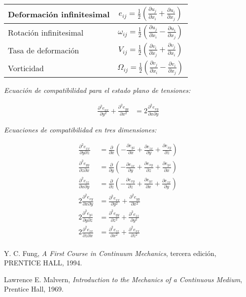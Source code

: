 \documentclass[a4paper,10pt,twoside,final,spanish]{article}
\begin{document}
\begin{center}
\begin{tabular}{l c} \toprule
Deformación infinitesimal & $\displaystyle e_{ij}=\frac{1}{2}\left(\frac{\partial u_{j}}{\partial x_{i}}+\frac{\partial u_{i}}{\partial x_{j}}\right)$ \\ \midrule
Rotación infinitesimal    & $\displaystyle \omega_{ij}=\frac{1}{2}\left(\frac{\partial u_{j}}{\partial x_{i}}-\frac{\partial u_{i}}{\partial x_{j}}\right)$ \\ \midrule
Tasa de deformación       & $\displaystyle V_{ij}=\frac{1}{2}\left(\frac{\partial v_{i}}{\partial x_{j}}+\frac{\partial v_{j}}{\partial x_{i}}\right)$ \\ \midrule
Vorticidad                & $\displaystyle \Omega_{ij}=\frac{1}{2}\left(\frac{\partial v_{j}}{\partial x_{i}}- \frac{\partial v_{i}}{\partial x_{j}}\right)$\\ \bottomrule
\end{tabular}
\end{center}

\vspace{1em}

\textit{Ecuación de compatibilidad para el estado plano de tensiones:}

\begin{align*}
\frac{\partial^{2}e_{xx}}{\partial y^{2}}+\frac{\partial^{2}e_{yy}}{\partial x^{2}}
&= 2\frac{\partial^{2}e_{xy}}{\partial x \partial y}
\end{align*}

\vspace{1em}

\textit{Ecuaciones de compatibilidad en tres dimensiones:}

\begin{align*}
\frac{\partial^{2}e_{xx}}{\partial y \partial z}
&= \frac{\partial}{\partial x}\left(
-\frac{\partial e_{yz}}{\partial x}
+\frac{\partial e_{zx}}{\partial y}
+\frac{\partial e_{xy}}{\partial z}\right) \\
\frac{\partial^{2}e_{yy}}{\partial z \partial x}
&= \frac{\partial}{\partial y}\left(
-\frac{\partial e_{zx}}{\partial y}
+\frac{\partial e_{xy}}{\partial z}
+\frac{\partial e_{yz}}{\partial x}\right) \\
\frac{\partial^{2}e_{zz}}{\partial x \partial y}
&= \frac{\partial}{\partial z}\left(
-\frac{\partial e_{xy}}{\partial z}
+\frac{\partial e_{yz}}{\partial x}
+\frac{\partial e_{zx}}{\partial y}\right) \\
2\frac{\partial^{2}e_{xy}}{\partial x \partial y}
&= \frac{\partial^{2}e_{xx}}{\partial y^{2}}
+\frac{\partial^{2}e_{yy}}{\partial x^{2}} \\
2\frac{\partial^{2}e_{yz}}{\partial y \partial z}
&= \frac{\partial^{2}e_{yy}}{\partial z^{2}}
+\frac{\partial^{2}e_{zz}}{\partial y^{2}} \\
2\frac{\partial^{2}e_{zx}}{\partial z \partial x}
&= \frac{\partial^{2}e_{zz}}{\partial x^{2}}
+\frac{\partial^{2}e_{xx}}{\partial z^{2}} \\
\end{align*}

\begin{thebibliography}{99}
Y. C. Fung,
\emph{A First Course in Continuum Mechanics}, 
tercera edición,
PRENTICE HALL,
1994.

Lawrence E. Malvern,
\emph{Introduction to the Mechanics of a Continuous Medium},
Prentice Hall,
1969. 
\end{thebibliography}
\end{document}
